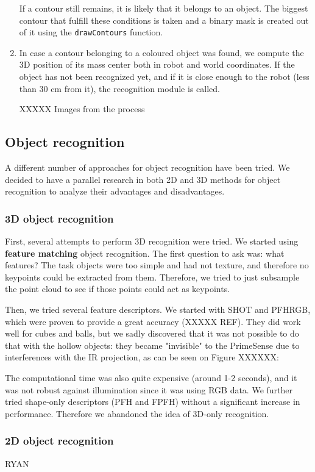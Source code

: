 \begin{enumerate}
If a contour still remains, it is likely that it belongs to an object. The biggest contour that fulfill these conditions is taken and a binary mask is created out of it using the \texttt{drawContours} function.

\item In case a contour belonging to a coloured object was found, we compute the 3D position of its mass center both in robot and world coordinates. If the object has not been recognized yet, and if it is close enough to the robot (less than 30 cm from it), the recognition module is called.

XXXXX Images from the process
\end{enumerate}

\subsection{Object recognition}
A different number of approaches for object recognition have been tried. We decided to have a parallel research in both 2D and 3D methods for object recognition to analyze their advantages and disadvantages. 

\subsubsection{3D object recognition}
First, several attempts to perform 3D recognition were tried. We started using \textbf{feature matching} object recognition. The first question to ask was: what features? The task objects were too simple and had not texture, and therefore no keypoints could be extracted from them. Therefore, we tried to just subsample the point cloud to see if those points could act as keypoints.

Then, we tried several feature descriptors. We started with SHOT and PFHRGB, which were proven to provide a great accuracy (XXXXX REF). They did work well for cubes and balls, but we sadly discovered that it was not possible to do that with the hollow objects: they became "invisible" to the PrimeSense due to interferences with the IR projection, as can be seen on Figure XXXXXX: 

The computational time was also quite expensive (around 1-2 seconds), and it was not robust against illumination since it was using RGB data. We further tried shape-only descriptors (PFH and FPFH) without a significant increase in performance. Therefore we abandoned the idea of 3D-only recognition.

\subsubsection{2D object recognition}
RYAN

